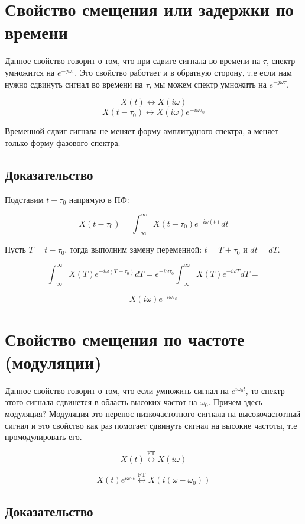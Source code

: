 \section*{\textbf{Свойство смещения или задержки по времени}}

Данное свойство говорит о том, что при сдвиге сигнала во времени на $\tau$, спектр умножится на $e^{-j\omega \tau}$. Это свойство
работает и в обратную сторону, т.е если нам нужно сдвинуть сигнал во времени на $\tau$, мы можем спектр умножить на $e^{-j\omega \tau}$.

$$X(t)\leftrightarrow X(i\omega)$$
$$X(t-\tau_0)\leftrightarrow X(i\omega)e^{-i\omega \tau_0}$$

Временной сдвиг сигнала не меняет форму амплитудного спектра, а меняет только форму фазового спектра.

\subsection*{\textbf{Доказательство}}

Подставим $t-\tau_0$ напрямую в ПФ:

$$X(t-\tau_0) = \int_{-\infty}^{\infty}X(t-\tau_0)e^{-i\omega(t)}dt$$

Пусть $T = t-\tau_0$, тогда выполним замену переменной: $t = T + \tau_0$ и $dt = dT$.

$$\int_{-\infty}^{\infty}X(T)e^{-i\omega(T+\tau_0)}dT = e^{-i\omega \tau_0} \int_{-\infty}^{\infty}X(T)e^{-i\omega T}dT = $$

$$X(i\omega) e^{-i\omega \tau_0} $$

\section*{\textbf{Свойство смещения по частоте (модуляции)}}

Данное свойство говорит о том, что если умножить сигнал на $e^{i\omega_0t}$, то спектр этого сигнала сдвинется в область высоких частот на $\omega_0$.
Причем здесь модуляция? Модуляция это перенос низкочастотного сигнала на высокочастотный сигнал и это свойство как раз помогает сдвинуть
сигнал на высокие частоты, т.е промодулировать его. 

$$X(t)\overset{\text{FT}}{\leftrightarrow}X(i\omega)$$

$$X(t)e^{i\omega_0t}\overset{\text{FT}}{\leftrightarrow} X(i(\omega - \omega_0))$$


\subsection*{\textbf{Доказательство}}

